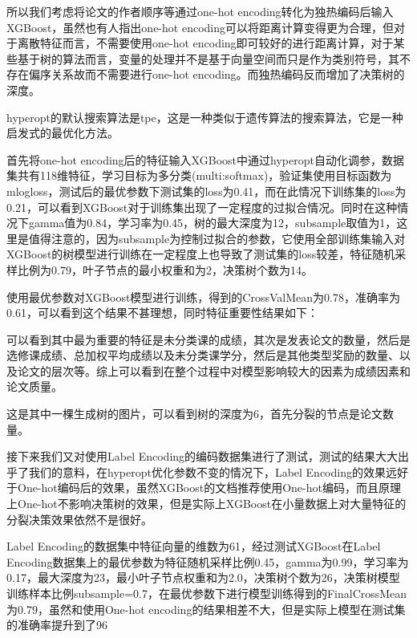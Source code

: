 所以我们考虑将论文的作者顺序等通过one-hot encoding转化为独热编码后输入XGBoost，虽然也有人指出one-hot encoding可以将距离计算变得更为合理，但对于离散特征而言，不需要使用one-hot encoding即可较好的进行距离计算，对于某些基于树的算法而言，变量的处理并不是基于向量空间而只是作为类别符号，其不存在偏序关系故而不需要进行one-hot encoding。而独热编码反而增加了决策树的深度。

hyperopt的默认搜索算法是tpe，这是一种类似于遗传算法的搜索算法，它是一种启发式的最优化方法。

首先将one-hot encoding后的特征输入XGBoost中通过hyperopt自动化调参，数据集共有118维特征，学习目标为多分类(multi:softmax)，验证集使用目标函数为mlogloss，测试后的最优参数下测试集的loss为0.41，而在此情况下训练集的loss为0.21，可以看到XGBoost对于训练集出现了一定程度的过拟合情况。同时在这种情况下gamma值为0.84，学习率为0.45，树的最大深度为12，subsample取值为1，这里是值得注意的，因为subsample为控制过拟合的参数，它使用全部训练集输入对XGBoost的树模型进行训练在一定程度上也导致了测试集的loss较差，特征随机采样比例为0.79，叶子节点的最小权重和为2，决策树个数为14。

使用最优参数对XGBoost模型进行训练，得到的CrossValMean为0.78，准确率为0.61，可以看到这个结果不甚理想，同时特征重要性结果如下：




可以看到其中最为重要的特征是未分类课的成绩，其次是发表论文的数量，然后是选修课成绩、总加权平均成绩以及未分类课学分，然后是其他类型奖励的数量、以及论文的层次等。综上可以看到在整个过程中对模型影响较大的因素为成绩因素和论文质量。




这是其中一棵生成树的图片，可以看到树的深度为6，首先分裂的节点是论文数量。

接下来我们又对使用Label Encoding的编码数据集进行了测试，测试的结果大大出乎了我们的意料，在hyperopt优化参数不变的情况下，Label Encoding的效果远好于One-hot编码后的效果，虽然XGBoost的文档推荐使用One-hot编码，而且原理上One-hot不影响决策树的效果，但是实际上XGBoost在小量数据上对大量特征的分裂决策效果依然不是很好。

Label Encoding的数据集中特征向量的维数为61，经过测试XGBoost在Label Encoding数据集上的最优参数为特征随机采样比例0.45，gamma为0.99，学习率为0.17，最大深度为23，最小叶子节点权重和为2.0，决策树个数为26，决策树模型训练样本比例subsample=0.7，在最优参数下进行模型训练得到的FinalCrossMean为0.79，虽然和使用One-hot encoding的结果相差不大，但是实际上模型在测试集的准确率提升到了96%




